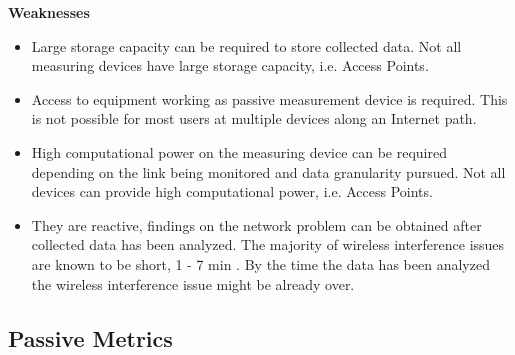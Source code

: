 \textbf{Weaknesses}
\begin{itemize}
	\item Large storage capacity can be required to store collected data. Not all measuring devices have large storage capacity, i.e. Access Points.
	\item Access to equipment working as passive measurement device is required. This is not possible for most users at multiple devices along an Internet path.
	\item High computational power on the measuring device can be required depending on the link being monitored and data granularity pursued. Not all devices can provide high computational power, i.e. Access Points.
	\item They are reactive, findings on the network problem can be obtained after collected data has been analyzed. The majority of wireless interference issues are known to be short, 1 - 7 min \cite{observing_through_wifi_APs}. By the time the data has been analyzed the wireless interference issue might be already over.
\end{itemize}

\subsection*{Passive Metrics}

